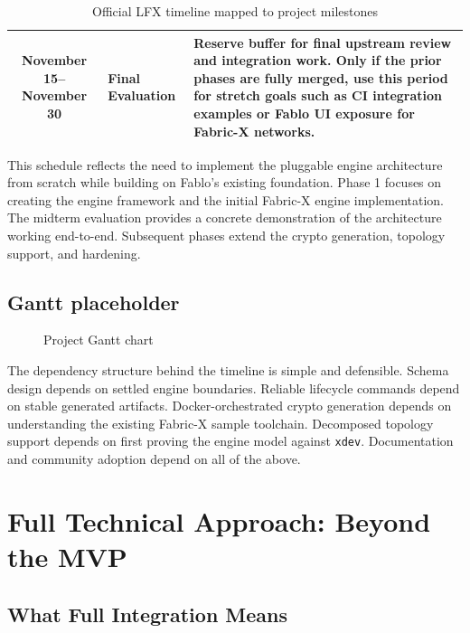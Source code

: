 \begin{table}[h]
\begin{tabularx}{\textwidth}{|c|p{3.2cm}|X|}
\hline
November 15--November 30 & Final Evaluation & Reserve buffer for final upstream review and integration work. Only if the prior phases are fully merged, use this period for stretch goals such as CI integration examples or Fablo UI exposure for Fabric-X networks. \\
\hline
\end{tabularx}
\caption{Official LFX timeline mapped to project milestones}
\label{tab:timeline}
\end{table}

This schedule reflects the need to implement the pluggable engine architecture from scratch while building on Fablo's existing foundation. Phase 1 focuses on creating the engine framework and the initial Fabric-X engine implementation. The midterm evaluation provides a concrete demonstration of the architecture working end-to-end. Subsequent phases extend the crypto generation, topology support, and hardening.

\subsection{Gantt placeholder}

\begin{figure}[h]
\centering
{}
\caption{Project Gantt chart}
\label{fig:gantt}
\end{figure}

The dependency structure behind the timeline is simple and defensible. Schema design depends on settled engine boundaries. Reliable lifecycle commands depend on stable generated artifacts. Docker-orchestrated crypto generation depends on understanding the existing Fabric-X sample toolchain. Decomposed topology support depends on first proving the engine model against \texttt{xdev}. Documentation and community adoption depend on all of the above.

\section{Full Technical Approach: Beyond the MVP}

\subsection{What Full Integration Means}

